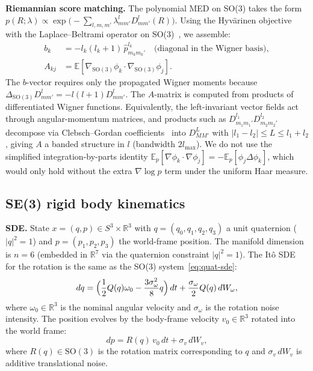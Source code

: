 \documentclass{article}
\newcommand{\R}{\mathbb{R}}
\newcommand{\E}{\mathbb{E}}
\theoremstyle{definition}
\begin{document}
\textbf{Riemannian score matching.}
The polynomial MED on SO(3) takes the form $p(R;\lambda) \propto \exp\!\bigl(-\sum_{l,m,m'} \lambda^l_{mm'} D^l_{mm'}(R)\bigr)$.
Using the Hyv\"arinen objective with the Laplace--Beltrami operator
on SO(3)~\cite{chirikjian2012}, we assemble:
\begin{align}
    b_k &= -l_k(l_k{+}1)\, \hat{p}^{l_k}_{m_k m_k'}
    \quad\text{(diagonal in the Wigner basis)}, \\
    A_{kj} &= \E[\nabla_{\mathrm{SO}(3)} \phi_k
    \cdot \nabla_{\mathrm{SO}(3)} \phi_j].
\end{align}
The $b$-vector requires only the propagated Wigner moments because
$\Delta_{\mathrm{SO}(3)}D^l_{mm'}=-l(l+1)D^l_{mm'}$.
The $A$-matrix is computed from products of differentiated Wigner functions.
Equivalently, the left-invariant vector fields act through angular-momentum
matrices, and products such as
$D^{l_1}_{m_1 m_1'} D^{l_2}_{m_2 m_2'}$ decompose via
Clebsch--Gordan coefficients~\cite{hall2015} into
$D^L_{MM'}$ with $|l_1{-}l_2| \le L \le l_1{+}l_2$,
giving $A$ a banded structure in $l$ (bandwidth $2l_{\max}$).
We do not use the simplified integration-by-parts identity
$\E_p[\nabla\phi_k\cdot\nabla\phi_j]=-\E_p[\phi_j\Delta\phi_k]$,
which would only hold without the extra $\nabla\log p$ term under the
uniform Haar measure.

\subsection{SE(3) rigid body kinematics}
\label{app:se3-generator}

\textbf{SDE.}
State $x = (q, p) \in S^3 \times \R^3$ with $q = (q_0, q_1, q_2, q_3)$
a unit quaternion ($|q|^2 = 1$) and $p = (p_1, p_2, p_3)$ the world-frame
position.
The manifold dimension is $n = 6$ (embedded in $\R^7$ via the quaternion
constraint $|q|^2 = 1$).
The It\^o SDE~\cite{choukroun2006} for the rotation is the same as the
SO(3) system~\eqref{eq:quat-sde}:
\begin{equation}\label{eq:se3-quat}
    dq = \Bigl(\frac{1}{2}Q(q)\omega_0
    - \frac{3\sigma_\omega^2}{8}q\Bigr)\,dt
    + \frac{\sigma_\omega}{2}Q(q)\,dW_\omega,
\end{equation}
where $\omega_0 \in \R^3$ is the nominal angular velocity
and $\sigma_\omega$ is the rotation noise intensity.
The position evolves by the body-frame velocity $v_0 \in \R^3$
rotated into the world frame:
\begin{equation}\label{eq:se3-pos}
    dp = R(q)\, v_0\, dt + \sigma_v\, dW_v,
\end{equation}
where $R(q) \in \mathrm{SO}(3)$ is the rotation matrix corresponding to $q$
and $\sigma_v\, dW_v$ is additive translational noise.
\end{document}
